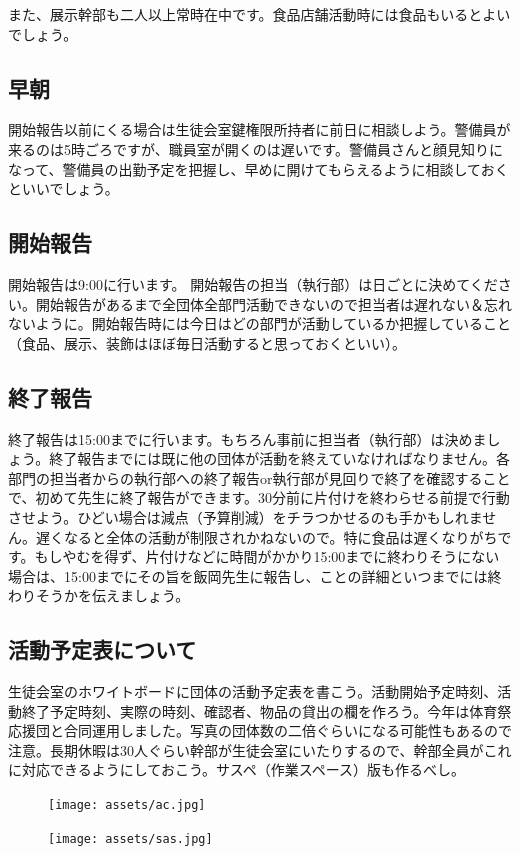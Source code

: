 \documentclass[dvipdfmx,jb5]{jreport}
\begin{document}
また、展示幹部も二人以上常時在中です。食品店舗活動時には食品もいるとよいでしょう。

\subsection{早朝}
開始報告以前にくる場合は生徒会室鍵権限所持者に前日に相談しよう。警備員が来るのは5時ごろですが、職員室が開くのは遅いです。警備員さんと顔見知りになって、警備員の出勤予定を把握し、早めに開けてもらえるように相談しておくといいでしょう。

\subsection{開始報告}
開始報告は9:00に行います。
開始報告の担当（執行部）は日ごとに決めてください。開始報告があるまで全団体全部門活動できないので担当者は遅れない＆忘れないように。開始報告時には今日はどの部門が活動しているか把握していること（食品、展示、装飾はほぼ毎日活動すると思っておくといい）。

\subsection{終了報告}
終了報告は15:00までに行います。もちろん事前に担当者（執行部）は決めましょう。終了報告までには既に他の団体が活動を終えていなければなりません。各部門の担当者からの執行部への終了報告or執行部が見回りで終了を確認することで、初めて先生に終了報告ができます。30分前に片付けを終わらせる前提で行動させよう。ひどい場合は減点（予算削減）をチラつかせるのも手かもしれません。遅くなると全体の活動が制限されかねないので。特に食品は遅くなりがちです。もしやむを得ず、片付けなどに時間がかかり15:00までに終わりそうにない場合は、15:00までにその旨を飯岡先生に報告し、ことの詳細といつまでには終わりそうかを伝えましょう。

\subsection{活動予定表について}
生徒会室のホワイトボードに団体の活動予定表を書こう。活動開始予定時刻、活動終了予定時刻、実際の時刻、確認者、物品の貸出の欄を作ろう。今年は体育祭応援団と合同運用しました。写真の団体数の二倍ぐらいになる可能性もあるので注意。長期休暇は30人ぐらい幹部が生徒会室にいたりするので、幹部全員がこれに対応できるようにしておこう。サスペ（作業スペース）版も作るべし。
\begin{figure}[h]
      \begin{center}
            \texttt{[image: assets/ac.jpg]}
      \end{center}
\end{figure}
\begin{figure}[h]
      \begin{center}
            \texttt{[image: assets/sas.jpg]}
      \end{center}
\end{figure}
\end{document}
